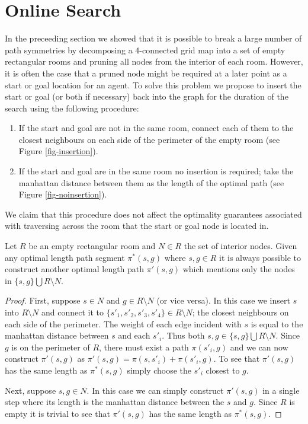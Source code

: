 \section{Online Search}
In the preceeding section we showed that it is possible to break a large 
number of path symmetries by decomposing a 4-connected grid map into 
a set of empty rectangular rooms and pruning all nodes from the interior of
each room.
However, it is often the case that a pruned node might be required at a later
point as a start or goal location for an agent.
To solve this problem we propose to insert the start or goal (or both if necessary)
back into the graph for the duration of the search using the following procedure:
\begin{enumerate}
\item{If the start and goal are not in the same room, connect each of them
to the closest neighbours on each side of the perimeter of the empty room (see Figure \ref{fig-insertion}).}
\item{If the start and goal are in the same room no insertion is required;
 take the manhattan distance between them as the length of the optimal path (see Figure \ref{fig-noinsertion}).}
\end{enumerate}
We claim that this procedure does not affect the optimality guarantees associated with traversing
across the room that the start or goal node is located in. 

\begin{lemma}
Let $R$ be an empty rectangular room and $N \in R$ the set of interior nodes.
Given any optimal length path segment $\pi^*(s, g)$ where $s, g \in R$
it is always possible to construct another optimal length path $\pi'(s, g)$ which 
mentions only the nodes in $\lbrace s, g \rbrace \bigcup  R \setminus N$.
\end{lemma}
\begin{proof}
First, suppose $s \in N$ and $g \in R \setminus N$ (or vice versa).
In this case we insert $s$ into $R \setminus N$ and connect it 
to $\lbrace s'_{1}, s'_{2}, s'_{3}, s'_{4} \rbrace \in R \setminus N$; the closest neighbours on each side of the perimeter.
The weight of each edge incident with $s$ is equal to the manhattan distance between
$s$ and each $s'_{i}$.
Thus both $s, g \in \lbrace s, g \rbrace \bigcup R \setminus N$.
Since $g$ is on the perimeter of $R$, there must exist a path $\pi(s'_{i}, g)$ and
we can now construct $\pi'(s, g)$ as $\pi'(s, g) = \pi(s,s'_{i}) + \pi(s'_{i}, g)$.
To see that $\pi'(s, g)$ has the same length as $\pi^*(s, g)$ simply choose the 
$s'_{i}$ closest to $g$. 
\par
Next, suppose $s, g \in N$. 
In this case we can simply construct $\pi'(s, g)$ in a single step where its
length is the manhattan distance between the $s$ and $g$.
Since $R$ is empty it is trivial to see that $\pi'(s, g)$ has the same length
as $\pi^*(s, g)$.
\end{proof}

